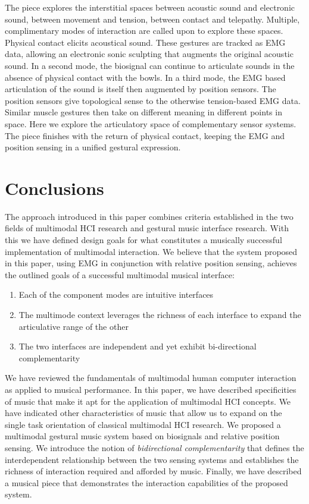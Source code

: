 The piece explores the interstitial spaces between acoustic sound and electronic sound, between movement and tension, between contact and telepathy. Multiple, complimentary modes of interaction are called upon to explore these spaces. Physical contact elicits acoustical sound. These gestures are tracked as EMG data, allowing an electronic sonic sculpting that augments the original acoustic sound. In a second mode, the biosignal can continue to articulate sounds in the absence of physical contact with the bowls. In a third mode, the EMG based articulation of the sound is itself then augmented by position sensors. The position sensors give topological sense to the otherwise tension-based EMG data. Similar muscle gestures then take on different meaning in different points in space. Here we explore the articulatory space of complementary sensor systems. The piece finishes with the return of physical contact, keeping the EMG and position sensing in a unified gestural expression.


\section{Conclusions}


The approach introduced in this paper combines criteria established in the two fields of multimodal HCI research and gestural music interface research. With this we have defined design goals for what constitutes a musically successful implementation of multimodal interaction. We believe that the system proposed in this paper, using EMG in conjunction with relative position sensing, achieves the outlined goals of a successful multimodal musical interface:

\begin{enumerate}
\item Each of the component modes are intuitive interfaces 
\item The multimode context leverages the richness of each interface to expand the articulative range of the other
\item The two interfaces are independent and yet exhibit bi-directional complementarity

\end{enumerate}

We have reviewed the fundamentals of multimodal human computer interaction as applied to musical performance. In this paper, we have described specificities of music that make it apt for the application of multimodal HCI concepts. We have indicated other characteristics of music that allow us to expand on the single task orientation of classical multimodal HCI research. We proposed a multimodal gestural music system based on biosignals and relative position sensing. We introduce the notion of \textit{bidirectional complementarity} that defines the interdependent relationship between the two sensing systems and establishes the richness of interaction required and afforded by music.  Finally, we have described a musical piece that demonstrates the interaction capabilities of the proposed system.
 


